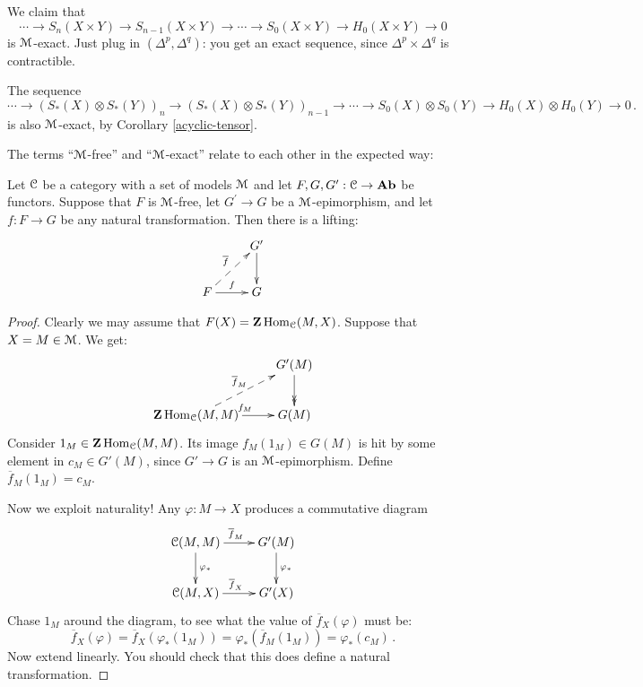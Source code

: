 \begin{example}
We claim that 
\[
\cdots\to S_n(X\times Y)\to S_{n-1}(X\times Y)\to\cdots\to S_0(X\times Y)\to H_0(X\times Y)\to 0
\]
is $\mathcal M$-exact. Just plug in $(\Delta^p,\Delta^q)$: you get an exact sequence, since $\Delta^p\times\Delta^q$ is contractible.
\end{example}
\begin{example}
The sequence
\[
\cdots\to(S_\ast(X)\otimes S_\ast(Y))_n\to(S_\ast(X)\otimes S_\ast(Y))_{n-1}\to
\cdots\to S_0(X)\otimes S_0(Y)\to H_0(X)\otimes H_0(Y)\to 0\,.
\]
is also $\mathcal M$-exact, by Corollary \ref{acyclic-tensor}.
\end{example}
The terms ``$\mathcal M$-free'' and ``$\mathcal M$-exact'' relate to each other in the 
expected way:
\begin{lemma}
Let $\mathcal C$ be a category with a set of models $\mathcal M$ and let $F,G,G^\prime:\mathcal C\to\mathbf{Ab}$ be functors. Suppose that $F$ is $\mathcal M$-free, let $G^\prime\to G$ be a $\mathcal M$-epimorphism, and let $f:F\to G$ be any natural transformation.  
Then there is a lifting:
\begin{equation*}
\xymatrix{ & G^\prime\ar[d]\\
F\ar@{-->}[ur]^{\overline{f}}\ar[r]^f & G}
\end{equation*}
\end{lemma}
\begin{proof}
Clearly we may assume that $F(X)=\mathbf Z\operatorname{Hom}_\mathcal C(M,X)$. Suppose that $X=M\in\mathcal M$. 
We get:
\begin{equation*}
\xymatrix{ & G^\prime(M)\ar@{->>}[d]\\
\Z\Hom_\cc(M,M)\ar@{-->}[ur]^{\overline{f}_M}\ar[r]^{f_M} & G(M)}
\end{equation*}
Consider $1_M\in\mathbf Z\operatorname{Hom}_\mathcal C(M,M)$. Its image  $f_M(1_M)\in G(M)$ is hit by
some element in $c_M\in G'(M)$, since $G'\to G$ is an $\mathcal M$-epimorphism. Define
$\overline f_M(1_M)=c_M$.

Now we exploit naturality! Any $\varphi:M\to X$ produces a commutative 
diagram
\begin{equation*}
\xymatrix{\cc(M,M)\ar[r]^{\overline{f}_M} \ar[d]^{\varphi_*}
& G^\prime(M)\ar[d]^{\varphi_*} \\
\cc(M,X)\ar[r]^{\overline{f}_X} & G^\prime(X)}
\end{equation*}
Chase $1_M$ around the diagram, to see what the value of 
$\overline{f}_X(\varphi)$ must be:
\[
\overline{f}_X(\varphi)=\overline{f}_X(\varphi_*(1_M))=
\varphi_*(\overline{f}_M(1_M))=\varphi_*(c_M)\,.
\]
Now extend linearly. You should check that this does define a natural
transformation. 
\end{proof}

